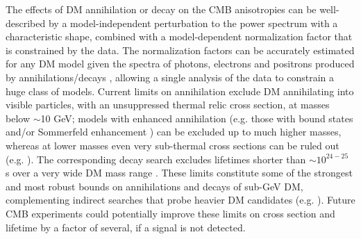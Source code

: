 \documentclass[12pt]{article}
\begin{document}
The effects of DM annihilation \cite{Slatyer:2015jla} or decay \cite{Slatyer:2016qyl} on the CMB anisotropies can be well-described by a model-independent perturbation to the power spectrum with a characteristic shape, combined with a model-dependent normalization factor that is constrained by the data. The normalization factors can be accurately estimated for any DM model given the spectra of photons, electrons and positrons produced by annihilations/decays \cite{Slatyer:2015kla}, allowing a single analysis of the data to constrain a huge class of models. Current limits on annihilation \cite{Aghanim:2018eyx} exclude DM annihilating into visible particles, with an unsuppressed thermal relic cross section, at masses below $\sim$10 GeV; models with enhanced annihilation (e.g. those with bound states and/or Sommerfeld enhancement \cite{Cirelli:2016rnw}) can be excluded up to much higher masses, whereas at lower masses even very sub-thermal cross sections can be ruled out (e.g. \cite{Slatyer:2015jla}). The corresponding decay search excludes lifetimes shorter than $\sim 10^{24-25}$ s over a very wide DM mass range \cite{Slatyer:2016qyl}. These limits constitute some of the strongest and most robust bounds on annihilations and decays of sub-GeV DM, complementing indirect searches that probe heavier DM candidates (e.g. \cite{Cohen:2016uyg}). Future CMB experiments could potentially improve these limits on cross section and lifetime by a factor of several, if a signal is not detected.


\end{document}
